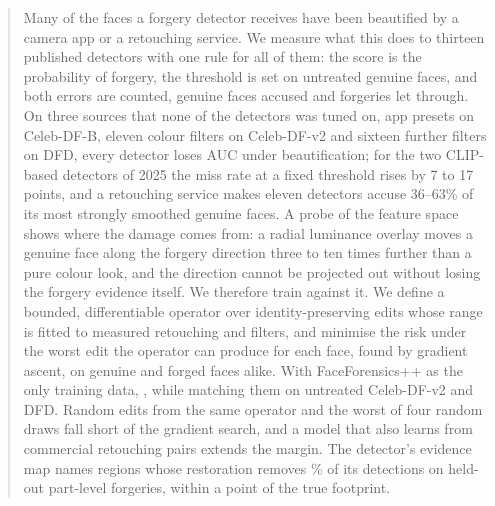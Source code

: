
\begin{abstract}
Many of the faces a forgery detector receives have been beautified by a camera app or a retouching service. We measure
what this does to thirteen published detectors with one rule for all of them: the score is the probability of forgery,
the threshold is set on untreated genuine faces, and both errors are counted, genuine faces accused and forgeries let
through. On three sources that none of the detectors was tuned on, app presets on Celeb-DF-B, eleven colour filters on
Celeb-DF-v2 and sixteen further filters on DFD, every detector loses AUC under beautification; for the two CLIP-based
detectors of 2025 the miss rate at a fixed threshold rises by 7 to 17 points, and a retouching service makes eleven
detectors accuse 36--63\% of its most strongly smoothed genuine faces. A probe of the feature space shows where the damage
comes from: a radial luminance overlay moves a genuine face along the forgery direction three to ten times further than a
pure colour look, and the direction cannot be projected out without losing the forgery evidence itself. We therefore train
against it. We define a bounded, differentiable operator over identity-preserving edits whose range is fitted to measured
retouching and filters, and minimise the risk under the worst edit the operator can produce for each face, found by
gradient ascent, on genuine and forged faces alike. With FaceForensics++ as the only training data, , while matching them on untreated Celeb-DF-v2 and DFD. Random edits from the same operator and the worst
of four random draws fall short of the gradient search, and a model that also learns from commercial retouching pairs
extends the margin. The detector's evidence map names regions whose restoration removes \% of its detections on
held-out part-level forgeries, within a point of the true footprint.
\end{abstract}

